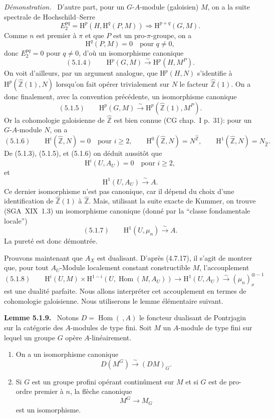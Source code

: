 \documentclass[11pt]{article}
\newenvironment{statement}[1]{\par\medskip\noindent\textbf{#1.}\ }{\par\medskip}
\newenvironment{prooftext}[1][Proof]{\par\noindent\emph{#1.}\ }{\par\medskip}
\renewcommand{\H}{\mathrm{H}}
\DeclareMathOperator{\Hom}{Hom}
\newcommand{\Z}{\mathbb{Z}}
\providecommand{\Hom}{\operatorname{Hom}}
\providecommand{\Z}{\mathbb Z}
\providecommand{\Hom}{\operatorname{Hom}}
\begin{document}
\begin{prooftext}[Démonstration]
D'autre part, pour un $G$-$A$-module (galoisien) $M$, on a la suite spectrale de Hochschild--Serre
\[
E_2^{pq}=\H^p(H,\H^q(P,M))\Longrightarrow \H^{p+q}(G,M).
\]
Comme $n$ est premier à $\pi$ et que $P$ est un pro-$\pi$-groupe, on a
\[
\H^q(P,M)=0\quad\text{pour }q\ne0,
\]
donc $E_2^{pq}=0$ pour $q\ne0$, d'où un isomorphisme canonique
\[
(5.1.4)\qquad \H^p(G,M)\xrightarrow{\sim}\H^p(H,M^P).
\]
On voit d'ailleurs, par un argument analogue, que $\H^p(H,N)$ s'identifie à $\H^p(\widehat{\Z}(1),N)$ lorsqu'on fait opérer trivialement sur $N$ le facteur $\widehat{\Z}(1)$. On a donc finalement, avec la convention précédente, un isomorphisme canonique
\[
(5.1.5)\qquad \H^p(G,M)\xrightarrow{\sim}\H^p(\widehat{\Z}(1),M^P).
\]
Or la cohomologie galoisienne de $\widehat{\Z}$ est bien connue (CG chap.~I p.~31): pour un $G$-$A$-module $N$, on a
\[
(5.1.6)\qquad
\H^i(\widehat{\Z},N)=0\quad\text{pour }i\geqslant2,
\qquad
\H^0(\widehat{\Z},N)=N^{\widehat{\Z}},
\qquad
\H^1(\widehat{\Z},N)=N_{\widehat{\Z}}.
\]
De (5.1.3), (5.1.5), et (5.1.6) on déduit aussitôt que
\[
\H^i(U,A_U)=0\quad\text{pour }i\geqslant2,
\]
et
\[
\H^1(U,A_U)\xrightarrow{\sim}A.
\]
Ce dernier isomorphisme n'est pas canonique, car il dépend du choix d'une identification de $\widehat{\Z}(1)$ à $\widehat{\Z}$. Mais, utilisant la suite exacte de Kummer, on trouve (SGA~XIX~1.3) un isomorphisme canonique (donné par la ``classe fondamentale locale'')
\[
(5.1.7)\qquad \H^1(U,\mu_n)\xrightarrow{\sim}A.
\]
La pureté est donc démontrée.

Prouvons maintenant que $A_X$ est dualisant. D'après (4.7.17), il s'agit de montrer que, pour tout $A_U$-Module localement constant constructible $M$, l'accouplement
\[
(5.1.8)\qquad \H^i(U,M)\times\H^{1-i}(U,\Hom(M,A_U))\longrightarrow \H^1(U,A_U)\xrightarrow{\sim}(\mu_n)_x^{\otimes -1}
\]
est une dualité parfaite. Nous allons interpréter cet accouplement en termes de cohomologie galoisienne. Nous utiliserons le lemme élémentaire suivant.
\end{prooftext}

\begin{statement}{Lemme 5.1.9}
Notons $D=\Hom(\ ,A)$ le foncteur dualisant de Pontrjagin sur la catégorie des $A$-modules de type fini. Soit $M$ un $A$-module de type fini sur lequel un groupe $G$ opère $A$-linéairement.
\begin{enumerate}[label=(\roman*)]
\item On a un isomorphisme canonique
\[
D(M^G)\xrightarrow{\sim}(DM)_G.
\]
\item Si $G$ est un groupe profini opérant continûment sur $M$ et si $G$ est de pro-ordre premier à $n$, la flèche canonique
\[
M^G\longrightarrow M_G
\]
est un isomorphisme.
\end{enumerate}
\end{statement}
\end{document}
